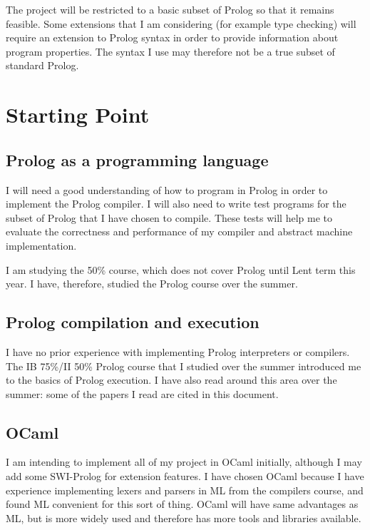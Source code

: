 \documentclass[12pt, a4paper]{article}
\begin{document}
The project will be restricted to a basic subset of Prolog so that it remains feasible. Some extensions that I am considering (for example type checking) will require an extension to Prolog syntax in order to provide information about program properties. The syntax I use may therefore not be a true subset of standard Prolog.


\section*{Starting Point}

\subsection*{Prolog as a programming language}

I will need a good understanding of how to program in Prolog in order to implement the Prolog compiler. I will also need to write test programs for the subset of Prolog that I have chosen to compile. These tests will help me to evaluate the correctness and performance of my compiler and abstract machine implementation.

I am studying the 50\% course, which does not cover Prolog until Lent term this year. I have, therefore, studied the Prolog course over the summer.

\subsection*{Prolog compilation and execution}

I have no prior experience with implementing Prolog interpreters or compilers. The IB 75\%/II 50\% Prolog course that I studied over the summer introduced me to the basics of Prolog execution. I have also read around this area over the summer: some of the papers I read are cited in this document.

\subsection*{OCaml}

I am intending to implement all of my project in OCaml initially, although I may add some SWI-Prolog for extension features. I have chosen OCaml because I have experience implementing lexers and parsers in ML from the compilers course, and found ML convenient for this sort of thing. OCaml will have same advantages as ML, but is more widely used and therefore has more tools and libraries available. 
\end{document}
